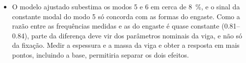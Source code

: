 \begin{itemize}
    \item O modelo ajustado subestima os modos 5 e 6 em cerca de \SI{8}{\percent}, e o
          sinal da constante modal do modo 5 só concorda com as formas do engaste. Como a
          razão entre as frequências medidas e as do engaste é quase constante
          (\numrange{0.81}{0.84}), parte da diferença deve vir dos parâmetros nominais
          da viga, e não só da fixação. Medir a espessura e a massa da viga e obter a
          resposta em mais pontos, incluindo a base, permitiria separar os dois efeitos.
\end{itemize}
